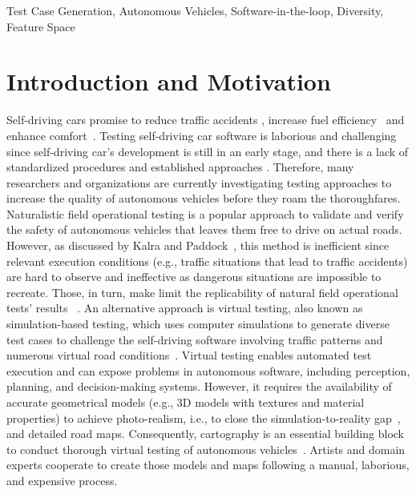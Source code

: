 \documentclass[conference]{IEEEtran}
\begin{document}
 \begin{IEEEkeywords}
Test Case Generation, Autonomous Vehicles, Software-in-the-loop, Diversity, Feature Space
 \end{IEEEkeywords}

\section{Introduction and Motivation}
Self-driving cars promise to reduce traffic accidents \cite{peden2016status}, increase fuel efficiency~\cite{zamzuri2016current} and enhance comfort~\cite{harper2016estimating}.
Testing self-driving car software is laborious and challenging since self-driving car's development is still in an early stage, and there is a lack of standardized procedures and established approaches \cite{gambi2019generating}. Therefore, many researchers and organizations are currently investigating testing approaches to increase the quality of autonomous vehicles before they roam the thoroughfares.
%
Naturalistic field operational testing is a popular approach to validate and verify the safety of autonomous vehicles that leaves them free to drive on actual roads. However, as discussed by Kalra and Paddock~\cite{kalra2016driving}, this method is inefficient since relevant execution conditions (e.g., traffic situations that lead to traffic accidents) are hard to observe and ineffective as dangerous situations are impossible to recreate. Those, in turn, make limit the replicability of natural field operational tests' results ~\cite{hasenau2019virtual}. An alternative approach is virtual testing, also known as simulation-based testing, which uses computer simulations to generate diverse test cases to challenge the self-driving software involving traffic patterns and numerous virtual road conditions~\cite{hasenau2019virtual}. Virtual testing enables automated test execution and can expose problems in autonomous software, including perception, planning, and decision-making systems. However, it requires the availability of accurate geometrical models (e.g., 3D models with textures and material properties) to achieve photo-realism, i.e., to close the simulation-to-reality gap~\cite{9207173}, and detailed road maps. Consequently, cartography is an essential building block to conduct thorough virtual testing of autonomous vehicles~\cite{althoff2018automatic}.  Artists and domain experts cooperate to create those models and maps following a manual, laborious, and expensive process.
\end{document}
